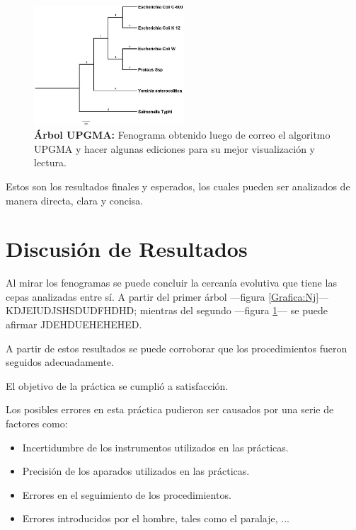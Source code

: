 \documentclass[%
 reprint,
 amsmath,amssymb,
 aps,
showkeys,
letter,
12pts
]{revtex4-1}
\begin{document}
		\begin{figure}[h!]
		\includegraphics[width=0.5\textwidth]{arbolUPGMA.jpg}
		\caption{\textbf{Árbol UPGMA:} Fenograma obtenido luego de correo el algoritmo UPGMA y hacer algunas ediciones para su mejor visualización y lectura.}
		\label{Grafica:UPGMA}
		\end{figure}	
		
		Estos son los resultados finales y esperados, los cuales pueden ser analizados de manera directa, clara y concisa.

\section{\label{sec:Dis}Discusión de Resultados}
	Al mirar los fenogramas se puede concluir la cercanía evolutiva que tiene las cepas analizadas entre sí. A partir del primer árbol ---figura \ref{Grafica:Nj}--- KDJEIUDJSHSDUDFHDHD; mientras del segundo ---figura \ref{Grafica:UPGMA}--- se puede afirmar JDEHDUEHEHEHED.
	
	A partir de estos resultados se puede corroborar que los procedimientos fueron seguidos adecuadamente.
	
	El objetivo de la práctica se cumplió a satisfacción.
	
	Los posibles errores en esta práctica pudieron ser causados por una serie de factores como:
	\begin{itemize}
	\item Incertidumbre de los instrumentos utilizados en las prácticas.
	\item Precisión de los aparados utilizados en las prácticas.
	\item Errores en el seguimiento de los procedimientos.
	\item Errores introducidos por el hombre, tales como el paralaje, ...
	\end{itemize}
	
	



\end{document}
